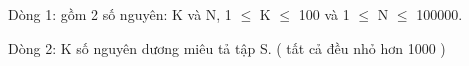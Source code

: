 Dòng 1: gồm 2 số nguyên: K và N, 1  $\le$  K  $\le$  100 và 1  $\le$  N  $\le$  100000.

Dòng 2: K số nguyên dương miêu tả tập S. ( tất cả đều nhỏ hơn 1000 )

\